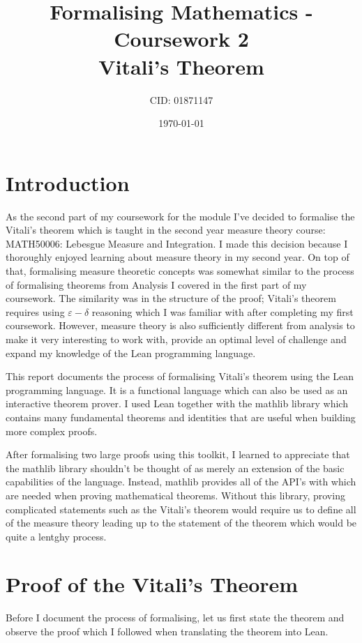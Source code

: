 \documentclass[11pt]{article}
\begin{document}
\title{Formalising Mathematics - Coursework 2 \\ Vitali's Theorem}
\date{\today}
\author{CID: 01871147}
\maketitle

\section*{Introduction}

As the second part of my coursework for the module I've decided to formalise the Vitali's theorem
which is taught in the second year measure theory course: MATH50006:
Lebesgue Measure and Integration. I made this decision because I thoroughly enjoyed
learning about measure theory in my second year. On top of that, formalising measure
theoretic concepts was somewhat similar to the process of formalising theorems
from Analysis I covered in the first part of my coursework.
The similarity was in the structure of the proof; Vitali's theorem requires using
$\varepsilon-\delta$ reasoning which I was familiar with after completing my first
coursework. However, measure theory is also sufficiently different from analysis
to make it very interesting to work with, provide an optimal level of challenge
and expand my knowledge of the Lean programming language.

This report documents the process of formalising Vitali's theorem using the Lean
programming language. It is a functional language which can also be used as an interactive
theorem prover. I used Lean together with the mathlib library which contains many
fundamental theorems and identities that are useful when building more complex proofs.

After formalising two large proofs using this toolkit, I learned to appreciate that
the mathlib library shouldn't be thought of as merely an extension of the basic
capabilities of the language. Instead, mathlib provides all of the API's with which
are needed when proving mathematical theorems. Without this library,
proving complicated statements such as the Vitali's theorem would require us to
define all of the measure theory leading up to the statement of the theorem
which would be quite a lentghy process.

\section*{Proof of the Vitali's Theorem}
Before I document the process of formalising, let us first state the
theorem and observe the proof which I followed when translating the theorem
into Lean.
\end{document}
